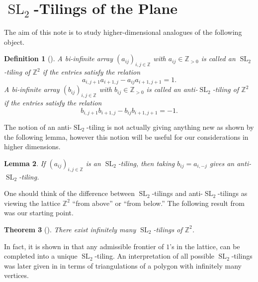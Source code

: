 \documentclass[12pt]{amsart}
\newtheorem{theorem}{Theorem}
\newtheorem{definition}[theorem]{Definition}
\newtheorem{lemma}[theorem]{Lemma}
\newcommand{\SL}{\operatorname{SL}}
\newcommand{\ZZ}{\mathbb{Z}}
\begin{document}
\section{$\SL_2$-Tilings of the Plane}
  The aim of this note is to study higher-dimensional analogues of the following object.
  \begin{definition}[\cite{AssemReutenauerSmith}]
    A bi-infinite array $(a_{ij})_{i,j\in\ZZ}$ with $a_{ij}\in\ZZ_{>0}$ is called an \emph{$\SL_2$-tiling of $\ZZ^2$} if the entries satisfy the relation
    \begin{equation}\label{eq:sl2 recursion}
      a_{i,j+1}a_{i+1,j}-a_{ij}a_{i+1,j+1}=1.
    \end{equation}
    A bi-infinite array $(b_{ij})_{i,j\in\ZZ}$ with $b_{ij}\in\ZZ_{>0}$  is called an \emph{anti-$\SL_2$-tiling of $\ZZ^2$} if the entries satisfy the relation
    \begin{equation}\label{eq:anti-sl2 recursion}
      b_{i,j+1}b_{i+1,j}-b_{ij}b_{i+1,j+1}=-1.
    \end{equation}
  \end{definition}
  The notion of an anti-$\SL_2$-tiling is not actually giving anything new as shown by the following lemma, however this notion will be useful for our considerations in higher dimensions.
  \begin{lemma}
    \label{lem:n=2 equivalent}
    If $(a_{ij})_{i,j\in\ZZ}$ is an $\SL_2$-tiling, then taking $b_{ij}=a_{i,-j}$ gives an anti-$\SL_2$-tiling.
  \end{lemma}
  One should think of the difference between $\SL_2$-tilings and anti-$\SL_2$-tilings as viewing the lattice $\ZZ^2$ ``from above'' or ``from below.''
  The following result from \cite{AssemReutenauerSmith} was our starting point.
  \begin{theorem}[\cite{AssemReutenauerSmith}]
    There exist infinitely many $\SL_2$-tilings of $\ZZ^2$.
  \end{theorem}

  In fact, it is shown in \cite{AssemReutenauerSmith} that any admissible frontier of $1$'s in the lattice, can be completed into a unique $\SL_2$-tiling.  
  An interpretation of all possible $\SL_2$-tilings was later given in \cite{BessenrodtHolmJorgensen} in terms of triangulations of a polygon with infinitely many vertices.
\end{document}
